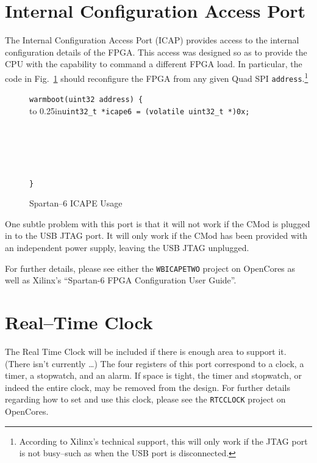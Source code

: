 \documentclass{gqtekspec}
\begin{document}
\section{Internal Configuration Access Port}
The Internal Configuration Access Port (ICAP) provides access to the internal
configuration details of the FPGA.  This access was designed so as to provide
the CPU with the capability to command a different FPGA load.  In particular,
the code in Fig.~\ref{fig:reload} should reconfigure the FPGA from any given
Quad SPI {\tt address}.\footnote{According to Xilinx's technical support, this
will only work if the JTAG port is not busy--such as when the USB port is
disconnected.}
\begin{figure}\begin{center}\begin{tabbing}
{\tt warmboot(uint32 address) \{} \\
\hbox to 0.25in{}\={\tt uint32\_t *icape6 = (volatile uint32\_t *)0x{\em <ICAPE port address>};}\\
 \\
 \\
 \\
 \\
 \\
{\tt \}}
\end{tabbing}
\caption{Spartan--6 ICAPE Usage}\label{fig:reload}
\end{center}\end{figure}

One subtle problem with this port is that it will not work if the CMod is
plugged in to the USB JTAG port.  It will only work if the CMod has been
provided with an independent power supply, leaving the USB JTAG unplugged.

For further details, please see either the {\tt WBICAPETWO} project on
OpenCores as well as Xilinx's ``Spartan-6 FPGA Configuration User Guide''.

\section{Real--Time Clock}

The Real Time Clock will be included if there is enough area to support it.
(There isn't currently \ldots)
The four registers of this port correspond to a clock, a timer, a stopwatch,
and an alarm.  If space is tight, the timer and stopwatch, or indeed the entire
clock, may be removed from the design.  For further details regarding how to
set and use this clock, please see the {\tt RTCCLOCK} project on OpenCores.
\end{document}
